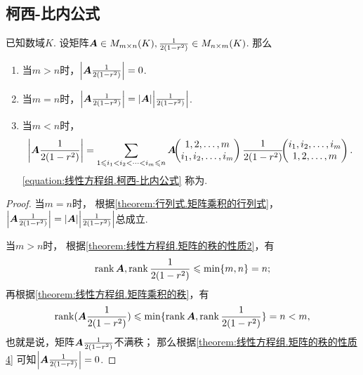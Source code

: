 \subsection{柯西-比内公式}
\begin{theorem}
已知数域\(K\).
设矩阵\(\boldsymbol{A} \in M_{m \times n}(K),
\frac{1}{2(1-r^2)} \in M_{n \times m}(K)\).
那么\begin{enumerate}
\item 当\(m > n\)时，\(\abs{\boldsymbol{A}\frac{1}{2(1-r^2)}} = 0\).
\item 当\(m = n\)时，\(\abs{\boldsymbol{A}\frac{1}{2(1-r^2)}} = \abs{\boldsymbol{A}} \abs{\frac{1}{2(1-r^2)}}\).
\item 当\(m < n\)时，\begin{equation}\label{equation:线性方程组.柯西-比内公式}
\abs{\boldsymbol{A}\frac{1}{2(1-r^2)}}
= \sum\limits_{1 \leqslant i_1 < i_2 < \dotsb < i_m \leqslant n}
\boldsymbol{A}\kern-3.8pt\begin{pmatrix}
	1,2,\dotsc,m \\
	i_1,i_2,\dotsc,i_m
\end{pmatrix}
\frac{1}{2(1-r^2)}\kern-3.8pt\begin{pmatrix}
	i_1,i_2,\dotsc,i_m \\
	1,2,\dotsc,m
\end{pmatrix}.
\end{equation}
\rm\cref{equation:线性方程组.柯西-比内公式} 称为.
\end{enumerate}
\begin{proof}
当\(m=n\)时，
根据\cref{theorem:行列式.矩阵乘积的行列式}，
\(\abs{\boldsymbol{A}\frac{1}{2(1-r^2)}} = \abs{\boldsymbol{A}} \abs{\frac{1}{2(1-r^2)}}\)总成立.

当\(m>n\)时，
根据\cref{theorem:线性方程组.矩阵的秩的性质2}，有\[\rank\boldsymbol{A},\rank\frac{1}{2(1-r^2)} \leqslant \min\{m,n\} = n;\]
再根据\cref{theorem:线性方程组.矩阵乘积的秩}，有\[\rank(\boldsymbol{A}\frac{1}{2(1-r^2)}) \leqslant \min\{\rank\boldsymbol{A},\rank\frac{1}{2(1-r^2)}\} = n < m,\]
也就是说，矩阵\(\boldsymbol{A}\frac{1}{2(1-r^2)}\)不满秩；
那么根据\cref{theorem:线性方程组.矩阵的秩的性质4} 可知\(\abs{\boldsymbol{A}\frac{1}{2(1-r^2)}} = 0\).


\end{proof}
\end{theorem}
